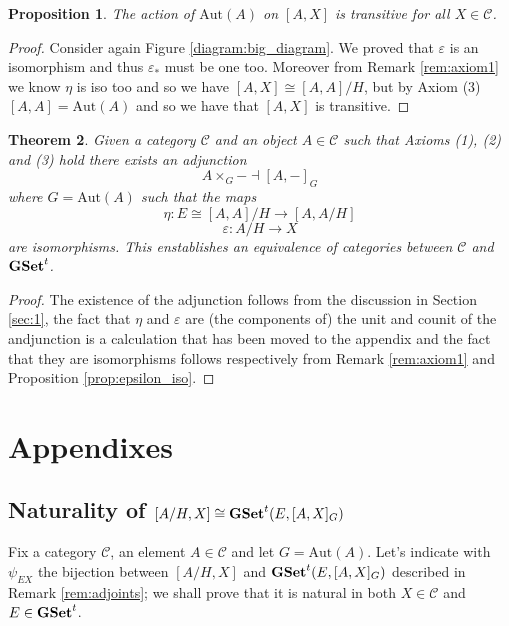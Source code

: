 \documentclass[italian, 12pt, reqno]{article}
\theoremstyle{myteo}
\newtheorem{theorem}{Theorem}[section]
\newtheorem{proposition}[theorem]{Proposition}
\numberwithin{equation}{section}
\newcommand{\cat}[1]{\mathscr{#1}}
\newcommand{\aut}{\text{Aut}}
\newcommand{\tgset}{\text{\textbf{GSet}}^t}
\newcommand{\homs}[2]{[#1, #2]}
\newcommand{\fun}[3]{#1\colon#2\to #3}
\begin{document}
\begin{proposition}
  \label{prop:transitive_action}
  The action of \(\text{Aut}(A)\) on \(\homs{A}{X}\) is transitive for all \(X\in\cat{C}\).
\end{proposition}

\begin{proof}
  Consider again Figure \ref{diagram:big_diagram}.
  We proved that \(\varepsilon\) is an isomorphism and thus \(\varepsilon_*\) must be one too.
  Moreover from Remark \ref{rem:axiom1} we know \(\eta\) is iso too and so we have \(\homs{A}{X}\cong \homs{A}{A}/H\), but by Axiom (3) \(\homs{A}{A} = \text{Aut}(A)\) and so we have that \(\homs{A}{X}\) is transitive.
\end{proof}

\begin{theorem}
  \label{theo:galois}
  Given a category \(\cat{C}\) and an object \(A\in\cat{C}\) such that Axioms (1), (2) and (3) hold there exists an adjunction
  \[A\times_G- \dashv \homs{A}{-}_G\]
  where \(G = \text{Aut}(A)\) such that the maps
  \[\fun{\eta}{E\cong \homs{A}{A}/H}{\homs{A}{A/H}}\]
  \[\fun{\varepsilon}{A/H}{X}\]
  are isomorphisms.
  This enstablishes an equivalence of categories between \(\cat{C}\) and \(\tgset\).
\end{theorem}

\begin{proof}
  The existence of the adjunction follows from the discussion in Section \ref{sec:1}, the fact that \(\eta\) and \(\varepsilon\) are (the components of) the unit and counit of the andjunction is a calculation that has been moved to the appendix and the fact that they are isomorphisms follows respectively from Remark \ref{rem:axiom1} and Proposition \ref{prop:epsilon_iso}.
\end{proof}

\section{Appendixes}
\label{sec:appendixes}

\subsection{Naturality of \(\homs{A/H}{X} \cong \tgset(E, \homs{A}{X}_G)\)}
Fix a category \(\cat{C}\), an element \(A\in\cat{C}\) and let \(G = \aut(A)\).
Let's indicate with \(\psi_{EX}\) the bijection between \(\homs{A/H}{X}\) and \(\tgset(E, \homs{A}{X}_G)\) described in Remark \ref{rem:adjoints}; we shall prove that it is natural in both \(X\in\cat{C}\) and \(E\in\tgset\).
\end{document}
